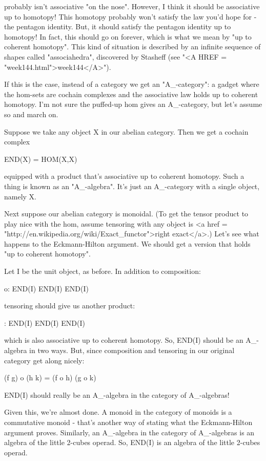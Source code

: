 probably isn't associative "on the nose".  However, I think
it should be associative up to homotopy!  This homotopy probably won't
satisfy the law you'd hope for - the pentagon identity.  But, it
should satisfy the pentagon identity up to homotopy!  In fact, this
should go on forever, which is what we mean by "up to coherent
homotopy".  This kind of situation is described by an infinite
sequence of shapes called "associahedra", discovered by
Stasheff (see "<A HREF = "week144.html">week144</A>").

If this is the case, instead of a category we get an
"A_{\infty }-category": a gadget where the hom-sets
are cochain complexes and the associative law holds up to coherent
homotopy.  I'm not sure the puffed-up hom gives an
A_{\infty }-category, but let's assume so and
march on.

Suppose we take any object X in our abelian category.  Then we get 
a cochain complex 

END(X) = HOM(X,X)

equipped with a product that's associative up to coherent 
homotopy.  Such a thing is known as an
"A_{\infty }-algebra".  It's just an
A_{\infty }-category with a single object, namely X.

Next suppose our abelian category is monoidal.  (To get the tensor 
product to play nice with the hom, assume tensoring with any object 
is <a href = "http://en.wikipedia.org/wiki/Exact_functor">right exact</a>.)  
Let's see what happens to the Eckmann-Hilton
argument.   We should get a version that holds "up to coherent
homotopy".  

Let I be the unit object, as before.  In addition to composition:

o: END(I) \times  END(I) \to  END(I)

tensoring should give us another product: 

\otimes : END(I) \times  END(I) \to  END(I)

which is also associative up to coherent homotopy.  So, END(I) should
be an A_{\infty }-algebra in two ways.  But, since composition
and tensoring in our original category get along nicely:

(f \otimes  g) o (h \otimes  k) = (f o h) \otimes  (g o k)

END(I) should really be an A_{\infty }-algebra in the category of 
A_{\infty }-algebras!

Given this, we're almost done.  A monoid in the category of monoids 
is a commutative monoid - that's another way of stating what the
Eckmann-Hilton argument proves.  Similarly, an A_{\infty }-algebra in 
the category of A_{\infty }-algebras is an algebra of the little 
2-cubes operad.  So, END(I) is an algebra of the little 2-cubes 
operad.

